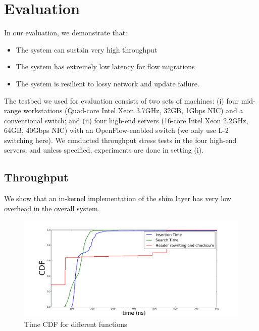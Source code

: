 
\section {Evaluation}


In our evaluation, we demonstrate that:

\begin{itemize}
 \item The system can sustain very high throughput
 \item The system has extremely low latency for flow migrations
 \item The system is resilient to lossy network and update failure. 
\end{itemize}


The testbed we used for evaluation consists of two sets of machines: (i) four mid-range workstations (Quad-core Intel Xeon 3.7GHz, 32GB, 1Gbps NIC) and a conventional switch; and (ii) four high-end servers (16-core Intel Xeon 2.2GHz, 64GB, 40Gbps NIC) with an OpenFlow-enabled switch (we only use L-2 switching here). We conducted throughput stress tests in the four high-end servers, and unless specified, experiments are done in setting (i). 



\subsection{Throughput }

We show that an in-kernel implementation of the shim layer has very low overhead in the overall system. 


\begin{figure}[ht]
\centering
\includegraphics[width=\linewidth]{figures/cdf.pdf} 
\caption{\small Time CDF for different functions}\label{throughput}
\end{figure}
% 

